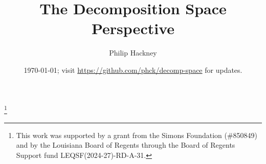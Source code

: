 \documentclass{amsart}
\theoremstyle{definition}
\newtheorem{convention}[theorem]{Convention}
\theoremstyle{remark}
\newcommand{\set}{\mathsf{Set}}
\newcommand{\spaces}{\mathsf{Space}}
\newcommand{\sset}{\mathsf{sSet}}
\newcommand{\sspace}{\mathsf{sSpace}}
\newcommand{\fun}{\mathsf{Fun}}
\newcommand{\op}{\textup{op}}
\begin{document}
\title{The Decomposition Space Perspective}
\author{Philip Hackney}
\address{Department of Mathematics, University of Louisiana at Lafayette, USA}
\thanks{This work was supported by a grant from the Simons Foundation (\#850849) and by the Louisiana Board of Regents through the Board of Regents Support fund LEQSF(2024-27)-RD-A-31.}

\date{\today; visit \url{https://github.com/phck/decomp-space} for updates.}



\maketitle

\end{document}
